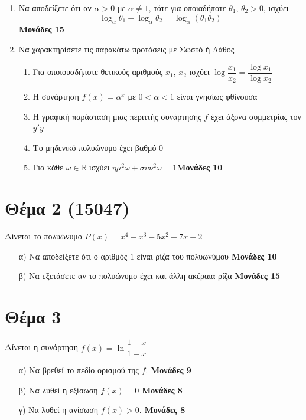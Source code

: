 \documentclass[12pt]{extarticle}
\begin{document}
\begin{enumerate}
    \item Να αποδείξετε ότι αν $α>0$ με $α \ne 1$, τότε για οποιαδήποτε $θ_1$, $θ_2>0$, ισχύει $$\log_α θ_1+\log_α θ_2=\log_α(θ_1 θ_2)$$ \hspace*{\fill} \textbf{Μονάδες 15}

    \item Να χαρακτηρίσετε τις παρακάτω προτάσεις με Σωστό ή Λάθος
          \begin{enumerate}
              \item Για οποιουσδήποτε θετικούς αριθμούς $x_1$, $x_2$ ισχύει $\log\dfrac{x_1}{x_2}=\dfrac{\log x_1}{\log x_2}$
              \item Η συνάρτηση $f(x)=α^x$ με $0<α<1$ είναι γνησίως φθίνουσα
              \item Η γραφική παράσταση μιας περιττής συνάρτησης $f$ έχει άξονα συμμετρίας τον $y'y$
              \item Το μηδενικό πολυώνυμο έχει βαθμό 0
              \item Για κάθε $ω\in\mathbb{R}$ ισχύει $ημ^2ω+συν^2ω=1$\hspace*{\fill}\textbf{Μονάδες 10}
          \end{enumerate}
\end{enumerate}

\section*{Θέμα 2 (15047)}
\noindent
Δίνεται το πολυώνυμο $P(x)=x^4-x^3-5x^2+7x-2$
\begin{enumerate}
    \item[α)] Να αποδείξετε ότι ο αριθμός $1$ είναι ρίζα του πολυωνύμου \hspace*{\fill} \textbf{Μονάδες 10}
    \item[β)] Να εξετάσετε αν το πολυώνυμο έχει και άλλη ακέραια ρίζα \hspace*{\fill} \textbf{Μονάδες 15}
\end{enumerate}

\section*{Θέμα 3}
\noindent

Δίνεται η συνάρτηση $f(x)=\ln \dfrac{1+x}{1-x}$
\begin{enumerate}
    \item[α)] Να βρεθεί το πεδίο ορισμού της $f$. \hspace*{\fill} \textbf{Μονάδες 9}
    \item[β)] Να λυθεί η εξίσωση $f(x)=0$ \hspace*{\fill} \textbf{Μονάδες 8}
    \item[γ)] Να λυθεί η ανίσωση $f(x)>0$. \hspace*{\fill} \textbf{Μονάδες 8}
\end{enumerate}
\end{document}
